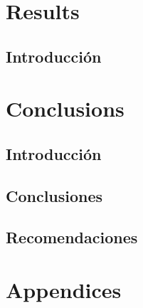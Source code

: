 \documentclass[english]{revcoles}
\begin{document}
\section{Results}

\subsection{Introducción}

\section{Conclusions}

\subsection{Introducción}

\subsection{Conclusiones}

\subsection{Recomendaciones}

\section{Appendices}



\appendix
\end{document}
